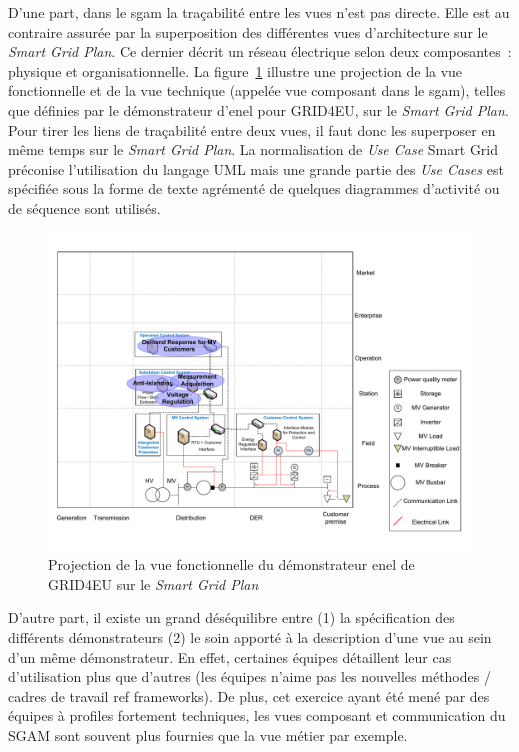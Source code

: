 D'une part, dans le \gls{sgam} la traçabilité entre les vues n'est pas directe.
Elle est au contraire assurée par la superposition des différentes vues
d'architecture sur le \textit{Smart Grid Plan}. Ce dernier décrit un réseau
électrique selon deux composantes~: physique et organisationnelle. La
figure~\ref{fig:enel_sgplan} illustre une projection de la vue fonctionnelle et
de la vue technique (appelée vue composant dans le \gls{sgam}), telles que
définies par le démonstrateur d'\gls{enel} pour GRID4EU, sur le \textit{Smart
Grid Plan}. Pour tirer les liens de traçabilité entre deux vues, il faut donc
les superposer en même temps sur le \textit{Smart Grid Plan}. La normalisation
de \textit{Use Case} Smart Grid préconise l'utilisation du langage UML mais une
grande partie des \textit{Use Cases} est spécifiée sous la forme de texte
agrémenté de quelques diagrammes d'activité ou de séquence sont utilisés.

\begin{figure}[!ht]
    \begin{center}
     \includegraphics[trim=0cm 1cm 0cm 1cm, width=1\textwidth]{figures/4_demarche/enel.pdf}
    \end{center}
    \caption{Projection de la vue fonctionnelle du démonstrateur \gls{enel} de
GRID4EU sur le \textit{Smart Grid Plan}} \label{fig:enel_sgplan}
\end{figure}

D'autre part, il existe un grand déséquilibre entre (1) la spécification des
différents démonstrateurs (2) le soin apporté à la description d'une vue au sein
d'un même démonstrateur. En effet, certaines équipes détaillent leur cas
d'utilisation plus que d'autres (les équipes n'aime pas les nouvelles méthodes /
cadres de travail ref frameworks). De plus, cet exercice ayant été mené par des
équipes à profiles fortement techniques, les vues composant et communication du
SGAM sont souvent plus fournies que la vue métier par exemple.

